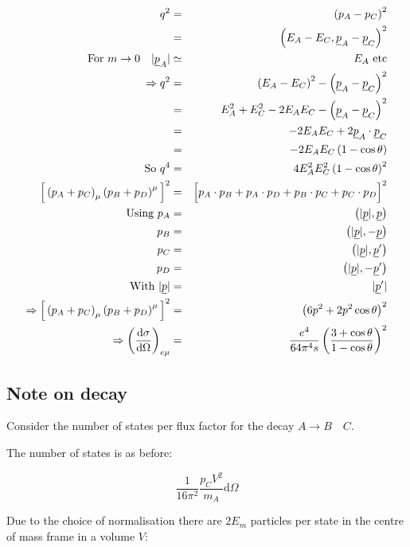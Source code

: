 \begin{eqnarray*}
  q^2 & = & \left(p_A - p_C\right)^2 \\
  & = & \left(E_A - E_C,\underline{p}_A - \underline{p}_C\right)^2 \\
  \textrm{For } m \to 0 \quad |\underline{p}_A| & \simeq & E_A \textrm{ etc} \\
  \Rightarrow q^2 & = & \left(E_A - E_C\right)^2 - \left(\underline{p}_A - \underline{p}_C\right)^2 \\
  & = & E_A^2 + E_C^2 - 2E_AE_C - \left(\underline{p}_A - \underline{p}_C\right)^2 \\
  & = & -2E_AE_C + 2\underline{p}_A\cdot\underline{p}_C \\
  & = & -2E_AE_C \left(1 - \cos \theta\right) \\
  \textrm{So } q^4 & = & 4E_A^2E_C^2\left(1 - \cos\theta\right)^2 \\
  \Big[\left(p_A + p_C\right)_{\mu}\left(p_B + p_D\right)^{\mu}\Big]^2 & = & \Big[p_A\cdot p_B + p_A\cdot p_D +p_B\cdot p_C + p_C\cdot p_D \Big]^2 \\
  \textrm{Using } p_A & = & \left(|\underline{p}|,\underline{p} \right) \\
  p_B & = & \left(|\underline{p}|,-\underline{p} \right) \\
  p_C & = & \left(|\underline{p}|,\underline{p}' \right) \\
  p_D & = & \left(|\underline{p}|,-\underline{p}' \right) \\
  \textrm{With } |\underline{p}| & = & |\underline{p}'| \\
  \Rightarrow \Big[\left(p_A + p_C\right)_{\mu}\left(p_B + p_D\right)^{\mu}\Big]^2 & = & \left(6p^2 + 2p^2\cos\theta\right)^2 \\
  \Rightarrow \left(\frac{\mathrm{d}\sigma}{\mathrm{d}\Omega}\right)_{e\mu} & = & \frac{e^4}{64\pi^4s}\left(\frac{3 + \cos\theta}{1 - \cos\theta}\right)^2
\end{eqnarray*}

\subsection{Note on decay}

Consider the number of states per flux factor for the decay $A \to B \quad C$.

The number of states is as before:

\[
  \frac{1}{16\pi^2}\frac{p_CV^2}{m_A}\mathrm{d}\Omega
\]

Due to the choice of normalisation there are $2E_m$ particles per state in the centre of mass frame in a volume $V$:

